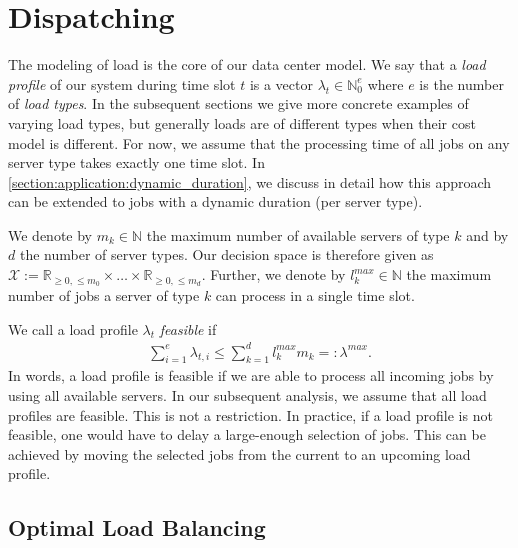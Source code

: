 \section{Dispatching}\label{section:application:dispatching}

The modeling of load is the core of our data center model. We say that a \emph{load profile} of our system during time slot $t$ is a vector $\lambda_t \in \mathbb{N}_0^e$ where $e$ is the number of \emph{load types}. In the subsequent sections we give more concrete examples of varying load types, but generally loads are of different types when their cost model is different. For now, we assume that the processing time of all jobs on any server type takes exactly one time slot. In \autoref{section:application:dynamic_duration}, we discuss in detail how this approach can be extended to jobs with a dynamic duration (per server type).

We denote by $m_k \in \mathbb{N}$ the maximum number of available servers of type $k$ and by $d$ the number of server types. Our decision space is therefore given as $\mathcal{X} := \mathbb{R}_{\geq 0, \leq m_0} \times \dots \times \mathbb{R}_{\geq 0, \leq m_d}$. Further, we denote by $l_k^{max} \in \mathbb{N}$ the maximum number of jobs a server of type $k$ can process in a single time slot.

We call a load profile $\lambda_t$ \emph{feasible} if \begin{align}
    \sum_{i=1}^e \lambda_{t,i} \leq \sum_{k=1}^d l_k^{max} m_k =: \lambda^{max}.
\label{eq:feasible_load_profiles}
\end{align} In words, a load profile is feasible if we are able to process all incoming jobs by using all available servers. In our subsequent analysis, we assume that all load profiles are feasible. This is not a restriction. In practice, if a load profile is not feasible, one would have to delay a large-enough selection of jobs. This can be achieved by moving the selected jobs from the current to an upcoming load profile.

\subsection{Optimal Load Balancing}\label{section:application:dispatching:optimal_load_balancing}

